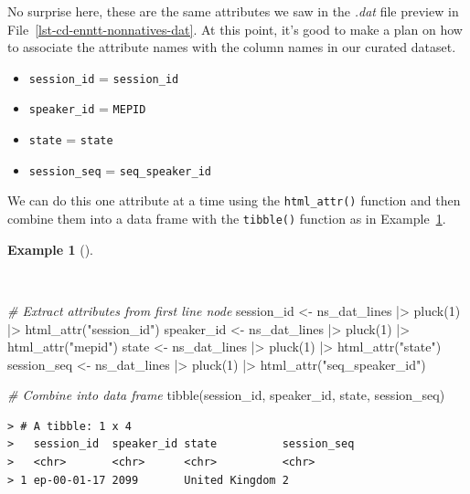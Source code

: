 \documentclass[
  letterpaper,
  DIV=11,
  numbers=noendperiod]{scrreprt}
\newenvironment{Shaded}{\begin{snugshade}}{\end{snugshade}}
\newcommand{\CommentTok}[1]{\textcolor[rgb]{0.00,0.00,0.00}{\textit{#1}}}
\newcommand{\DecValTok}[1]{\textcolor[rgb]{0.00,0.00,0.00}{#1}}
\newcommand{\FunctionTok}[1]{\textcolor[rgb]{0.00,0.00,0.00}{#1}}
\newcommand{\NormalTok}[1]{\textcolor[rgb]{0.00,0.00,0.00}{#1}}
\newcommand{\OtherTok}[1]{\textcolor[rgb]{0.00,0.00,0.00}{#1}}
\newcommand{\SpecialCharTok}[1]{\textcolor[rgb]{0.00,0.00,0.00}{#1}}
\newcommand{\StringTok}[1]{\textcolor[rgb]{0.00,0.00,0.00}{#1}}
\providecommand{\tightlist}{%
  \setlength{\itemsep}{0pt}\setlength{\parskip}{0pt}}\usepackage{longtable,booktabs,array}
\theoremstyle{definition}
\newtheorem{example}{Example}[chapter]
\theoremstyle{remark}
\begin{document}
No surprise here, these are the same attributes we saw in the
\emph{.dat} file preview in File~\ref{lst-cd-enntt-nonnatives-dat}. At
this point, it's good to make a plan on how to associate the attribute
names with the column names in our curated dataset.

\begin{itemize}
\tightlist
\item
  \texttt{session\_id} = \texttt{session\_id}
\item
  \texttt{speaker\_id} = \texttt{MEPID}
\item
  \texttt{state} = \texttt{state}
\item
  \texttt{session\_seq} = \texttt{seq\_speaker\_id}
\end{itemize}

We can do this one attribute at a time using the \texttt{html\_attr()}
function and then combine them into a data frame with the
\texttt{tibble()} function as in
Example~\ref{exm-cd-enntt-extract-attributes}.

\begin{example}[]\protect\hypertarget{exm-cd-enntt-extract-attributes}{}\label{exm-cd-enntt-extract-attributes}

~

\begin{Shaded}
\begin{Highlighting}[]
\CommentTok{\# Extract attributes from first line node}
\NormalTok{session\_id }\OtherTok{\textless{}{-}}\NormalTok{ ns\_dat\_lines }\SpecialCharTok{|\textgreater{}} \FunctionTok{pluck}\NormalTok{(}\DecValTok{1}\NormalTok{) }\SpecialCharTok{|\textgreater{}} \FunctionTok{html\_attr}\NormalTok{(}\StringTok{"session\_id"}\NormalTok{)}
\NormalTok{speaker\_id }\OtherTok{\textless{}{-}}\NormalTok{ ns\_dat\_lines }\SpecialCharTok{|\textgreater{}} \FunctionTok{pluck}\NormalTok{(}\DecValTok{1}\NormalTok{) }\SpecialCharTok{|\textgreater{}} \FunctionTok{html\_attr}\NormalTok{(}\StringTok{"mepid"}\NormalTok{)}
\NormalTok{state }\OtherTok{\textless{}{-}}\NormalTok{ ns\_dat\_lines }\SpecialCharTok{|\textgreater{}} \FunctionTok{pluck}\NormalTok{(}\DecValTok{1}\NormalTok{) }\SpecialCharTok{|\textgreater{}} \FunctionTok{html\_attr}\NormalTok{(}\StringTok{"state"}\NormalTok{)}
\NormalTok{session\_seq }\OtherTok{\textless{}{-}}\NormalTok{ ns\_dat\_lines }\SpecialCharTok{|\textgreater{}} \FunctionTok{pluck}\NormalTok{(}\DecValTok{1}\NormalTok{) }\SpecialCharTok{|\textgreater{}} \FunctionTok{html\_attr}\NormalTok{(}\StringTok{"seq\_speaker\_id"}\NormalTok{)}

\CommentTok{\# Combine into data frame}
\FunctionTok{tibble}\NormalTok{(session\_id, speaker\_id, state, session\_seq)}
\end{Highlighting}
\end{Shaded}

\begin{verbatim}
> # A tibble: 1 x 4
>   session_id  speaker_id state          session_seq
>   <chr>       <chr>      <chr>          <chr>      
> 1 ep-00-01-17 2099       United Kingdom 2
\end{verbatim}

\end{example}
\end{document}
